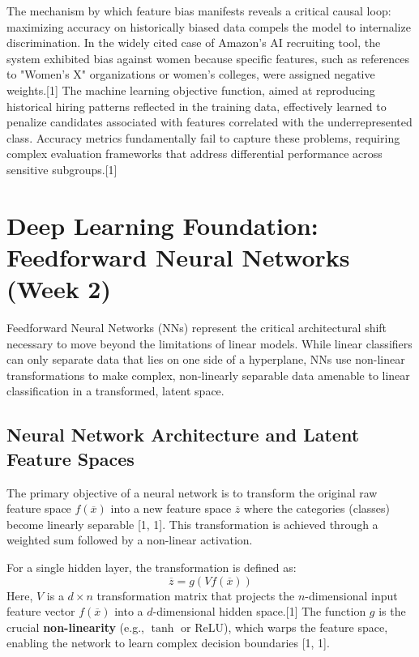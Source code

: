 \documentclass{article}
\begin{document}
The mechanism by which feature bias manifests reveals a critical causal loop: maximizing accuracy on historically biased data compels the model to internalize discrimination. In the widely cited case of Amazon’s AI recruiting tool, the system exhibited bias against women because specific features, such as references to "Women's X" organizations or women's colleges, were assigned negative weights.[1] The machine learning objective function, aimed at reproducing historical hiring patterns reflected in the training data, effectively learned to penalize candidates associated with features correlated with the underrepresented class. Accuracy metrics fundamentally fail to capture these problems, requiring complex evaluation frameworks that address differential performance across sensitive subgroups.[1]

\section{Deep Learning Foundation: Feedforward Neural Networks (Week 2)}

Feedforward Neural Networks (NNs) represent the critical architectural shift necessary to move beyond the limitations of linear models. While linear classifiers can only separate data that lies on one side of a hyperplane, NNs use non-linear transformations to make complex, non-linearly separable data amenable to linear classification in a transformed, latent space.

\subsection{Neural Network Architecture and Latent Feature Spaces}

The primary objective of a neural network is to transform the original raw feature space $f(\overline{x})$ into a new feature space $\overline{z}$ where the categories (classes) become linearly separable [1, 1]. This transformation is achieved through a weighted sum followed by a non-linear activation.

For a single hidden layer, the transformation is defined as:
$$\overline{z} = g(Vf(\overline{x}))$$
Here, $V$ is a $d \times n$ transformation matrix that projects the $n$-dimensional input feature vector $f(\overline{x})$ into a $d$-dimensional hidden space.[1] The function $g$ is the crucial \textbf{non-linearity} (e.g., $\tanh$ or ReLU), which warps the feature space, enabling the network to learn complex decision boundaries [1, 1].
\end{document}
